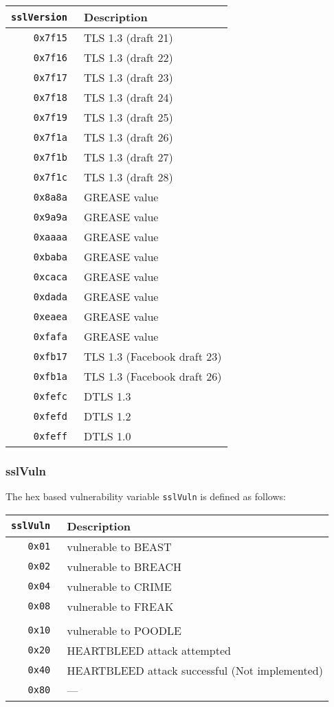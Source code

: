\documentclass[documentation]{subfiles}
\begin{document}
\begin{minipage}{.48\textwidth}
    \begin{longtable}{>{\tt}rl}
        \toprule
        {\bf sslVersion} & {\bf Description} \\
        \midrule\endhead%
        0x7f15 & TLS 1.3 (draft 21)\\
        0x7f16 & TLS 1.3 (draft 22)\\
        0x7f17 & TLS 1.3 (draft 23)\\
        0x7f18 & TLS 1.3 (draft 24)\\
        0x7f19 & TLS 1.3 (draft 25)\\
        0x7f1a & TLS 1.3 (draft 26)\\
        0x7f1b & TLS 1.3 (draft 27)\\
        0x7f1c & TLS 1.3 (draft 28)\\
        0x8a8a & GREASE value\\
        0x9a9a & GREASE value\\
        0xaaaa & GREASE value\\
        0xbaba & GREASE value\\
        0xcaca & GREASE value\\
        0xdada & GREASE value\\
        0xeaea & GREASE value\\
        0xfafa & GREASE value\\
        0xfb17 & TLS 1.3 (Facebook draft 23)\\
        0xfb1a & TLS 1.3 (Facebook draft 26)\\
        0xfefc & DTLS 1.3\\
        0xfefd & DTLS 1.2\\
        0xfeff & DTLS 1.0\\
        \bottomrule
    \end{longtable}
\end{minipage}

\subsubsection{sslVuln}\label{sslVuln}
The hex based vulnerability variable {\tt sslVuln} is defined as follows:
\begin{longtable}{>{\tt}rl}
    \toprule
    {\bf sslVuln} & {\bf Description} \\
    \midrule\endhead%
    0x01 & vulnerable to BEAST\\
    0x02 & vulnerable to BREACH\\
    0x04 & vulnerable to CRIME\\
    0x08 & vulnerable to FREAK\\
    \\
    0x10 & vulnerable to POODLE\\
    0x20 & HEARTBLEED attack attempted\\
    0x40 & HEARTBLEED attack successful (Not implemented)\\
    0x80 & ---\\
    \bottomrule
\end{longtable}
\end{document}
